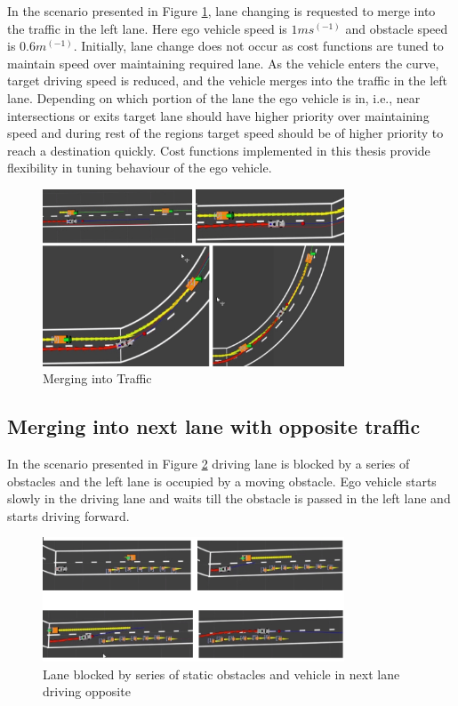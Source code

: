 In the scenario presented in Figure \ref{merging1}, lane changing is requested to merge into the traffic in the left lane. Here ego vehicle speed is $1ms^(-1)$ and obstacle speed is $0.6m^(-1)$. Initially, lane change does not occur as cost functions are tuned to maintain speed over maintaining required lane. As the vehicle enters the curve, target driving speed is reduced, and the vehicle merges into the traffic in the left lane. Depending on which portion of the lane the ego vehicle is in, i.e., near intersections or exits target lane should have higher priority over maintaining speed and during rest of the regions target speed should be of higher priority to reach a destination quickly. Cost functions implemented in this thesis provide flexibility in tuning behaviour of the ego vehicle. 

\begin{figure}[h]
    \centering
    \includegraphics[width=0.8\textwidth]{Images/evaluation/merging1.jpg}
    \caption{Merging into Traffic}
    \label{merging1}
\end{figure}

\subsection{Merging into next lane with opposite traffic}

In the scenario presented in Figure \ref{series_obstacles} driving lane is blocked by a series of obstacles and the left lane is occupied by a moving obstacle. Ego vehicle starts slowly in the driving lane and waits till the obstacle is passed in the left lane and starts driving forward. 
\begin{figure}[h]
    \centering
    \includegraphics[width=0.8\textwidth]{Images/evaluation/series_lane_blocked1.jpg}
    \caption{Lane blocked by series of static obstacles and vehicle in next lane driving opposite}
    \label{series_obstacles}
\end{figure}

